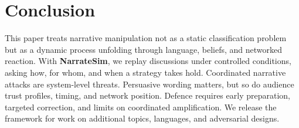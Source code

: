 \section{Conclusion}
\label{sec:conclusion}

This paper treats narrative manipulation not as a static classification problem but as a dynamic process unfolding through language, beliefs, and networked reaction. With \textbf{NarrateSim}, we replay discussions under controlled conditions, asking how, for whom, and when a strategy takes hold. Coordinated narrative attacks are system-level threats. Persuasive wording matters, but so do audience trust profiles, timing, and network position. Defence requires early preparation, targeted correction, and limits on coordinated amplification. We release the framework for work on additional topics, languages, and adversarial designs.
